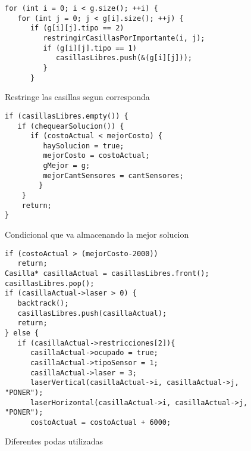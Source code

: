 \begin{figure}[H]
\begin{center}
\begin{verbatim}
for (int i = 0; i < g.size(); ++i) {
   for (int j = 0; j < g[i].size(); ++j) {
      if (g[i][j].tipo == 2)
         restringirCasillasPorImportante(i, j); 
         if (g[i][j].tipo == 1) 
            casillasLibres.push(&(g[i][j]));
         }
      }
\end{verbatim}
\caption{Restringe las casillas segun corresponda}
\end{center}
\end{figure}

\begin{figure}[H]
\begin{center}
\begin{verbatim}
if (casillasLibres.empty()) {
   if (chequearSolucion()) { 
      if (costoActual < mejorCosto) {
         haySolucion = true;
         mejorCosto = costoActual;
         gMejor = g;	
         mejorCantSensores = cantSensores;
        }
    }
    return;
}
\end{verbatim}
\caption{Condicional que va almacenando la mejor solucion}
\end{center}
\end{figure}

\begin{figure}[H]
\begin{center}
\begin{verbatim}
if (costoActual > (mejorCosto-2000))
   return;
Casilla* casillaActual = casillasLibres.front();  
casillasLibres.pop();
if (casillaActual->laser > 0) {
   backtrack();
   casillasLibres.push(casillaActual);
   return;
} else {
   if (casillaActual->restricciones[2]){ 
      casillaActual->ocupado = true;
      casillaActual->tipoSensor = 1;
      casillaActual->laser = 3;
      laserVertical(casillaActual->i, casillaActual->j, "PONER");
      laserHorizontal(casillaActual->i, casillaActual->j, "PONER");
      costoActual = costoActual + 6000;
\end{verbatim}
\caption{Diferentes podas utilizadas}
\end{center}
\end{figure}

